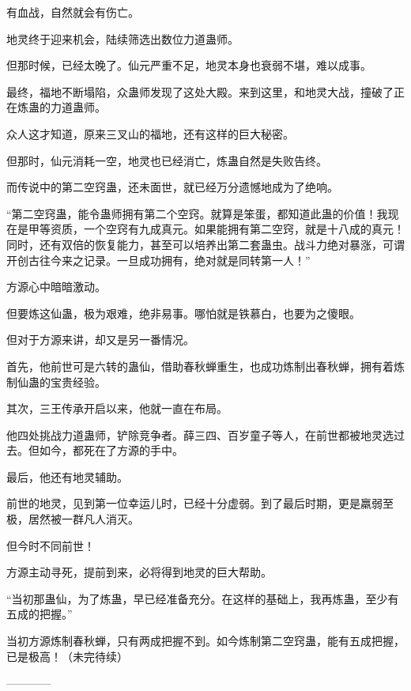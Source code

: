 \begin{this_body}
有血战，自然就会有伤亡。

地灵终于迎来机会，陆续筛选出数位力道蛊师。

但那时候，已经太晚了。仙元严重不足，地灵本身也衰弱不堪，难以成事。

最终，福地不断塌陷，众蛊师发现了这处大殿。来到这里，和地灵大战，撞破了正在炼蛊的力道蛊师。

众人这才知道，原来三叉山的福地，还有这样的巨大秘密。

但那时，仙元消耗一空，地灵也已经消亡，炼蛊自然是失败告终。

而传说中的第二空窍蛊，还未面世，就已经万分遗憾地成为了绝响。

“第二空窍蛊，能令蛊师拥有第二个空窍。就算是笨蛋，都知道此蛊的价值！我现在是甲等资质，一个空窍有九成真元。如果能拥有第二空窍，就是十八成的真元！同时，还有双倍的恢复能力，甚至可以培养出第二套蛊虫。战斗力绝对暴涨，可谓开创古往今来之记录。一旦成功拥有，绝对就是同转第一人！”

方源心中暗暗激动。

但要炼这仙蛊，极为艰难，绝非易事。哪怕就是铁慕白，也要为之傻眼。

但对于方源来讲，却又是另一番情况。

首先，他前世可是六转的蛊仙，借助春秋蝉重生，也成功炼制出春秋蝉，拥有着炼制仙蛊的宝贵经验。

其次，三王传承开启以来，他就一直在布局。

他四处挑战力道蛊师，铲除竞争者。薛三四、百岁童子等人，在前世都被地灵选过去。但如今，都死在了方源的手中。

最后，他还有地灵辅助。

前世的地灵，见到第一位幸运儿时，已经十分虚弱。到了最后时期，更是羸弱至极，居然被一群凡人消灭。

但今时不同前世！

方源主动寻死，提前到来，必将得到地灵的巨大帮助。

“当初那蛊仙，为了炼蛊，早已经准备充分。在这样的基础上，我再炼蛊，至少有五成的把握。”

当初方源炼制春秋蝉，只有两成把握不到。如今炼制第二空窍蛊，能有五成把握，已是极高！（未完待续）

------------

\end{this_body}

